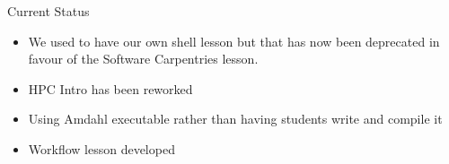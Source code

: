 \begin{frame}{Current Status}
	
	\begin{itemize}
		\item We used to have our own shell lesson but that has now been deprecated in favour of the Software Carpentries lesson.
		\item HPC Intro has been reworked
		\item Using Amdahl executable rather than having students write and compile it
		\item Workflow lesson developed
	\end{itemize}
	
	
\note{}
\end{frame}
